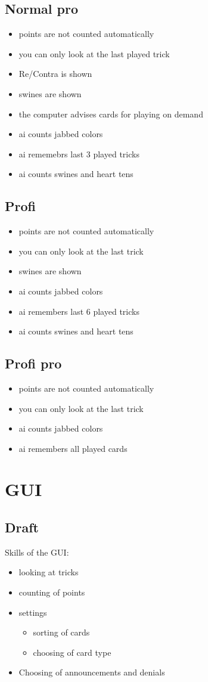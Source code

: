 \documentclass[12pt,a4paper]{article}
\begin{document}
\subsection{Normal pro}
\begin{itemize}
\item points are not counted automatically
\item you can only look at the last played trick
\item Re/Contra is shown
\item swines are shown
\item the computer advises cards for playing on demand
\item ai counts jabbed colors
\item ai rememebrs last 3 played tricks
\item ai counts swines and heart tens
\end{itemize}
\subsection{Profi}
\begin{itemize}
\item points are not counted automatically
\item you can only look at the last trick
\item swines are shown
\item ai counts jabbed colors
\item ai remembers last 6 played tricks
\item ai counts swines and heart tens
\end{itemize}
\subsection{Profi pro}
\begin{itemize}
\item points are not counted automatically
\item you can only look at the last trick
\item ai counts jabbed colors
\item ai remembers all played cards
\end{itemize}
\newpage
\section{GUI}
\subsection{Draft}
Skills of the GUI:
\begin{itemize}
\item looking at tricks
\item counting of points
\item settings
\begin{itemize}
\item sorting of cards
\item choosing of card type
\end{itemize}
\item Choosing of announcements and denials
\end{itemize}
\end{document}
